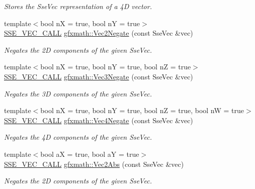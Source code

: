 \begin{DoxyCompactItemize}
\begin{DoxyCompactList}\small\item\em Stores the Sse\+Vec representation of a 4\+D vector. \end{DoxyCompactList}\item 
{\footnotesize template$<$bool n\+X = true, bool n\+Y = true$>$ }\\\hyperlink{ssevec__math__defs_8h_a97454f977a5281455cecacce1e8ba670}{S\+S\+E\+\_\+\+V\+E\+C\+\_\+\+C\+A\+L\+L} \hyperlink{group___s_i_m_d_vec_math_ga6282fa159691ae4d727443d1ce33c403}{gfxmath\+::\+Vec2\+Negate} (const Sse\+Vec \&vec)
\begin{DoxyCompactList}\small\item\em Negates the 2\+D components of the given Sse\+Vec. \end{DoxyCompactList}\item 
{\footnotesize template$<$bool n\+X = true, bool n\+Y = true, bool n\+Z = true$>$ }\\\hyperlink{ssevec__math__defs_8h_a97454f977a5281455cecacce1e8ba670}{S\+S\+E\+\_\+\+V\+E\+C\+\_\+\+C\+A\+L\+L} \hyperlink{group___s_i_m_d_vec_math_ga4336d462fab1c81e24ede5524dc42fd7}{gfxmath\+::\+Vec3\+Negate} (const Sse\+Vec \&vec)
\begin{DoxyCompactList}\small\item\em Negates the 3\+D components of the given Sse\+Vec. \end{DoxyCompactList}\item 
{\footnotesize template$<$bool n\+X = true, bool n\+Y = true, bool n\+Z = true, bool n\+W = true$>$ }\\\hyperlink{ssevec__math__defs_8h_a97454f977a5281455cecacce1e8ba670}{S\+S\+E\+\_\+\+V\+E\+C\+\_\+\+C\+A\+L\+L} \hyperlink{group___s_i_m_d_vec_math_ga90514fd8b92db14a3e7bcc24919c60dc}{gfxmath\+::\+Vec4\+Negate} (const Sse\+Vec \&vec)
\begin{DoxyCompactList}\small\item\em Negates the 4\+D components of the given Sse\+Vec. \end{DoxyCompactList}\item 
{\footnotesize template$<$bool a\+X = true, bool a\+Y = true$>$ }\\\hyperlink{ssevec__math__defs_8h_a97454f977a5281455cecacce1e8ba670}{S\+S\+E\+\_\+\+V\+E\+C\+\_\+\+C\+A\+L\+L} \hyperlink{group___s_i_m_d_vec_math_ga497ee900cf75d92c569c100d4048198c}{gfxmath\+::\+Vec2\+Abs} (const Sse\+Vec \&vec)
\begin{DoxyCompactList}\small\item\em Negates the 2\+D components of the given Sse\+Vec. \end{DoxyCompactList}\item 

\end{DoxyCompactItemize}
